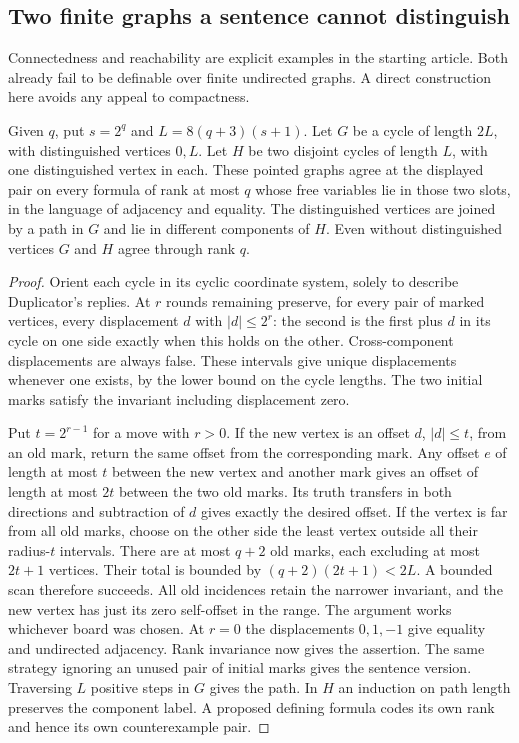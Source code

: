\subsection{Two finite graphs a sentence cannot distinguish}
Connectedness and reachability are explicit examples in the starting article. Both already fail to be definable over finite undirected graphs. A direct construction here avoids any appeal to compactness.

\begin{theorem}\label{thm:cycles}
Given $q$, put $s=2^q$ and $L=8(q+3)(s+1)$. Let $G$ be a cycle of length $2L$, with distinguished vertices $0,L$. Let $H$ be two disjoint cycles of length $L$, with one distinguished vertex in each. These pointed graphs agree at the displayed pair on every formula of rank at most $q$ whose free variables lie in those two slots, in the language of adjacency and equality. The distinguished vertices are joined by a path in $G$ and lie in different components of $H$. Even without distinguished vertices $G$ and $H$ agree through rank $q$.
\end{theorem}
\begin{proof}
Orient each cycle in its cyclic coordinate system, solely to describe Duplicator's replies. At $r$ rounds remaining preserve, for every pair of marked vertices, every displacement $d$ with $|d|\le 2^r$: the second is the first plus $d$ in its cycle on one side exactly when this holds on the other. Cross-component displacements are always false. These intervals give unique displacements whenever one exists, by the lower bound on the cycle lengths. The two initial marks satisfy the invariant including displacement zero.

Put $t=2^{r-1}$ for a move with $r>0$. If the new vertex is an offset $d$, $|d|\le t$, from an old mark, return the same offset from the corresponding mark. Any offset $e$ of length at most $t$ between the new vertex and another mark gives an offset of length at most $2t$ between the two old marks. Its truth transfers in both directions and subtraction of $d$ gives exactly the desired offset. If the vertex is far from all old marks, choose on the other side the least vertex outside all their radius-$t$ intervals. There are at most $q+2$ old marks, each excluding at most $2t+1$ vertices. Their total is bounded by $(q+2)(2t+1)<2L$. A bounded scan therefore succeeds. All old incidences retain the narrower invariant, and the new vertex has just its zero self-offset in the range. The argument works whichever board was chosen. At $r=0$ the displacements $0,1,-1$ give equality and undirected adjacency. Rank invariance now gives the assertion. The same strategy ignoring an unused pair of initial marks gives the sentence version. Traversing $L$ positive steps in $G$ gives the path. In $H$ an induction on path length preserves the component label. A proposed defining formula codes its own rank and hence its own counterexample pair.
\end{proof}
